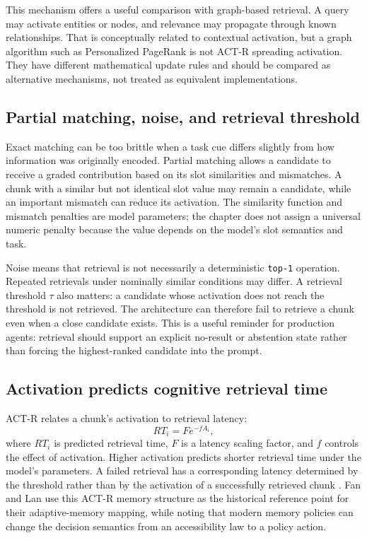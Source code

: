 This mechanism offers a useful comparison with graph-based retrieval. A query may activate entities or nodes, and relevance may propagate through known relationships. That is conceptually related to contextual activation, but a graph algorithm such as Personalized PageRank is not ACT-R spreading activation. They have different mathematical update rules and should be compared as alternative mechanisms, not treated as equivalent implementations.

\subsection{Partial matching, noise, and retrieval threshold}
\label{subsec:ch12-partial-threshold}

Exact matching can be too brittle when a task cue differs slightly from how information was originally encoded. Partial matching allows a candidate to receive a graded contribution based on its slot similarities and mismatches. A chunk with a similar but not identical slot value may remain a candidate, while an important mismatch can reduce its activation. The similarity function and mismatch penalties are model parameters; the chapter does not assign a universal numeric penalty because the value depends on the model's slot semantics and task.

Noise means that retrieval is not necessarily a deterministic \texttt{top-1} operation. Repeated retrievals under nominally similar conditions may differ. A retrieval threshold \(\tau\) also matters: a candidate whose activation does not reach the threshold is not retrieved. The architecture can therefore fail to retrieve a chunk even when a close candidate exists. This is a useful reminder for production agents: retrieval should support an explicit no-result or abstention state rather than forcing the highest-ranked candidate into the prompt.

\subsection{Activation predicts cognitive retrieval time}
\label{subsec:ch12-retrieval-latency}

ACT-R relates a chunk's activation to retrieval latency:
\begin{equation}
  RT_i = F e^{-fA_i},
  \label{eq:ch12-actr-latency}
\end{equation}
where \(RT_i\) is predicted retrieval time, \(F\) is a latency scaling factor, and \(f\) controls the effect of activation. Higher activation predicts shorter retrieval time under the model's parameters. A failed retrieval has a corresponding latency determined by the threshold rather than by the activation of a successfully retrieved chunk \autocite[p. 267]{actr7manual}. Fan and Lan use this ACT-R memory structure as the historical reference point for their adaptive-memory mapping, while noting that modern memory policies can change the decision semantics from an accessibility law to a policy action.


